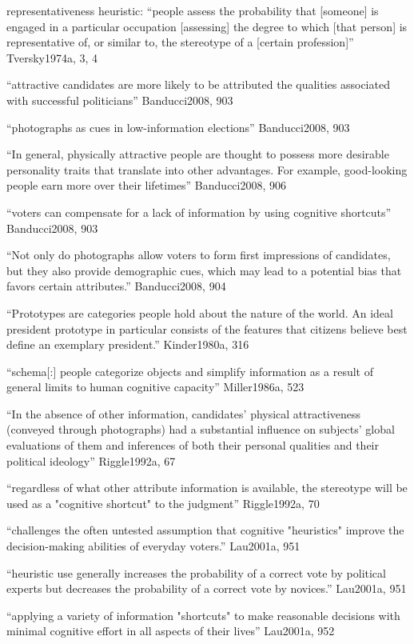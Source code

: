 representativeness heuristic: ``people assess the probability that [someone] is engaged in a particular occupation [assessing] the degree to which [that person] is representative of, or similar to, the stereotype of a [certain profession]'' Tversky1974a, 3, 4

``attractive candidates are more likely to be attributed the qualities associated with successful politicians'' Banducci2008, 903

``photographs as cues in low-information elections'' Banducci2008, 903

``In general, physically attractive people are thought to possess more desirable
personality traits that translate into other advantages. For example, good-looking people earn more over their lifetimes'' Banducci2008, 906

``voters can compensate for a lack of information by using cognitive shortcuts'' Banducci2008, 903

``Not only do photographs allow voters to form first impressions of candidates, but they also provide demographic cues, which may lead to a potential bias that favors certain attributes.'' Banducci2008, 904

``Prototypes are categories people hold about the nature of the world. An ideal president prototype in particular consists of the features that citizens believe best define an exemplary president.'' Kinder1980a, 316

``schema[:] people categorize objects and simplify information as a result of general limits to human cognitive capacity'' Miller1986a, 523

``In the absence of other information, candidates' physical attractiveness (conveyed through photographs) had a substantial influence on subjects' global evaluations of them and inferences of both their personal qualities and their political ideology'' Riggle1992a, 67

``regardless of what other attribute information is available, the stereotype will be used as a "cognitive shortcut" to the judgment'' Riggle1992a, 70

``challenges the often untested assumption that cognitive "heuristics" improve the decision-making abilities of everyday voters.'' Lau2001a, 951

``heuristic use generally increases the probability of a correct vote by political experts but decreases the probability of a correct vote by novices.'' Lau2001a, 951

``applying a variety of information "shortcuts" to make reasonable decisions with minimal cognitive effort in all aspects of their lives'' Lau2001a, 952

